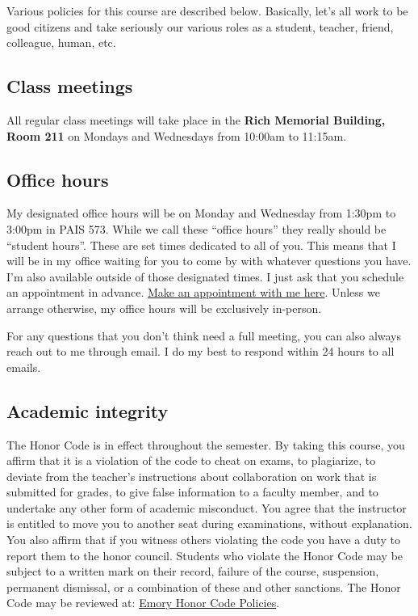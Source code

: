 \documentclass[11pt,]{article}
\begin{document}
Various policies for this course are described below. Basically, let's
all work to be good citizens and take seriously our various roles as a
student, teacher, friend, colleague, human, etc.

\hypertarget{class-meetings}{%
\subsection{Class meetings}\label{class-meetings}}

All regular class meetings will take place in the \textbf{Rich Memorial
Building, Room 211} on Mondays and Wednesdays from 10:00am to 11:15am.

\hypertarget{office-hours}{%
\subsection{Office hours}\label{office-hours}}

My designated office hours will be on Monday and Wednesday from 1:30pm
to 3:00pm in PAIS 573. While we call these ``office hours'' they really
should be ``student hours''. These are set times dedicated to all of
you. This means that I will be in my office waiting for you to come by
with whatever questions you have. I'm also available outside of those
designated times. I just ask that you schedule an appointment in
advance. \href{https://mccarthy-meetings.youcanbook.me/}{Make an
appointment with me here}. Unless we arrange otherwise, my office hours
will be exclusively in-person.

For any questions that you don't think need a full meeting, you can also
always reach out to me through email. I do my best to respond within 24
hours to all emails.

\hypertarget{academic-integrity}{%
\subsection{Academic integrity}\label{academic-integrity}}

The Honor Code is in effect throughout the semester. By taking this
course, you affirm that it is a violation of the code to cheat on exams,
to plagiarize, to deviate from the teacher's instructions about
collaboration on work that is submitted for grades, to give false
information to a faculty member, and to undertake any other form of
academic misconduct. You agree that the instructor is entitled to move
you to another seat during examinations, without explanation. You also
affirm that if you witness others violating the code you have a duty to
report them to the honor council. Students who violate the Honor Code
may be subject to a written mark on their record, failure of the course,
suspension, permanent dismissal, or a combination of these and other
sanctions. The Honor Code may be reviewed at:
\href{http://catalog.college.emory.edu/academic/policies-regulations/honor-code.html}{Emory
Honor Code Policies}.
\end{document}
